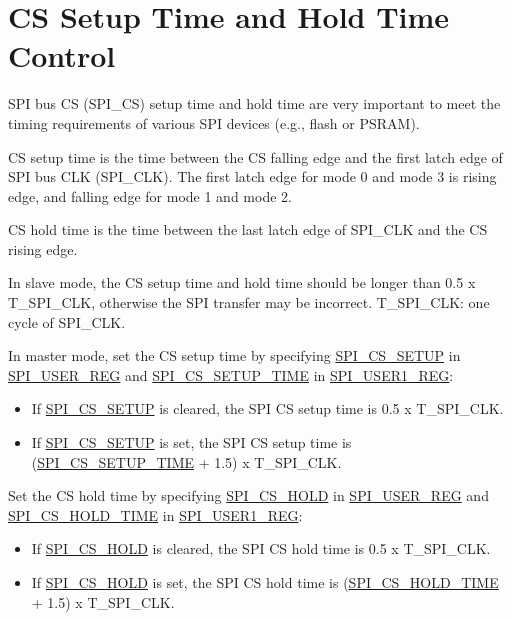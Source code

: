 \documentclass[main\_\_EN.tex]{subfiles}
\begin{document}
\section{CS Setup Time and Hold Time Control}\label{sec:gp-spi2-cs-timing}

SPI bus CS (SPI\_CS) setup time and hold time are very important to meet the timing requirements of various SPI devices (e.g., flash or PSRAM).

CS setup time is the time between the CS falling edge and the first latch edge of SPI bus CLK (SPI\_CLK). The first latch edge for mode 0 and mode 3 is rising edge, and falling edge for mode 1 and mode 2.

CS hold time is the time between the last latch edge of SPI\_CLK and the CS rising edge.

In slave mode, the CS setup time and hold time should be longer than 0.5 x T\_SPI\_CLK, otherwise the SPI transfer may be incorrect. T\_SPI\_CLK: one cycle of SPI\_CLK.

In master mode, set the CS setup time by specifying \hyperref[fielddesc:SPICSSETUP]{SPI\_CS\_SETUP} in \hyperref[regdesc:SPIUSERREG]{SPI\_USER\_REG} and  \hyperref[fielddesc:SPICSSETUPTIME]{SPI\_CS\_SETUP\_TIME} in \hyperref[regdesc:SPIUSER1REG]{SPI\_USER1\_REG}:
    \begin{itemize}
        \item If \hyperref[fielddesc:SPICSSETUP]{SPI\_CS\_SETUP} is cleared, the SPI CS setup time is 0.5 x T\_SPI\_CLK.
        \item If \hyperref[fielddesc:SPICSSETUP]{SPI\_CS\_SETUP} is set, the SPI CS setup time is (\hyperref[fielddesc:SPICSSETUPTIME]{SPI\_CS\_SETUP\_TIME} + 1.5) x T\_SPI\_CLK.
    \end{itemize}

Set the CS hold time by specifying \hyperref[fielddesc:SPICSHOLD]{SPI\_CS\_HOLD} in \hyperref[regdesc:SPIUSERREG]{SPI\_USER\_REG} and  \hyperref[fielddesc:SPICSHOLDTIME]{SPI\_CS\_HOLD\_TIME} in \hyperref[regdesc:SPIUSER1REG]{SPI\_USER1\_REG}:
    \begin{itemize}
        \item If \hyperref[fielddesc:SPICSHOLD]{SPI\_CS\_HOLD} is cleared, the SPI CS hold time is 0.5 x T\_SPI\_CLK.
        \item If \hyperref[fielddesc:SPICSHOLD]{SPI\_CS\_HOLD} is set, the SPI CS hold time is (\hyperref[fielddesc:SPICSHOLDTIME]{SPI\_CS\_HOLD\_TIME} + 1.5) x T\_SPI\_CLK.
    \end{itemize}
\end{document}
